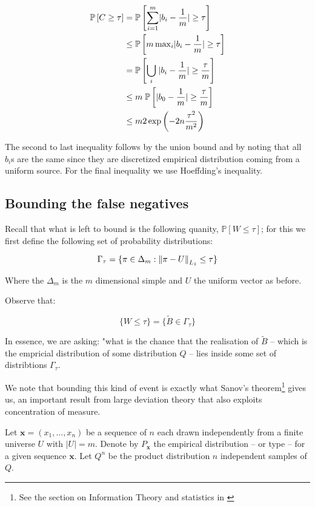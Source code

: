 \begin{align}
    \mathbb{P}\left[ C \geq \tau \right] &= \mathbb{P}\left[ \sum_{i = 1}^{m} \lvert b_i - \frac{1}{m}\rvert \geq \tau \right]  \\
    &\leq \mathbb{P}\left[ m \operatorname{max}_{i} \lvert b_i - \frac{1}{m}\rvert \geq \tau \right]  \\
    &= \mathbb{P}\left[ \bigcup_{i} \; \lvert b_i - \frac{1}{m}\rvert \geq \frac{\tau}{m} \right]  \\
    &\leq m \; \mathbb{P}\left[ \lvert b_0 - \frac{1}{m}\rvert \geq \frac{\tau}{m} \right] \\
    &\leq m2\exp \left( -2n \frac{\tau^2}{m^2} \right)
\end{align}

The second to last inequality follows by the union bound and by noting that all $b_i$s are the same since they
are discretized empirical distribution coming from a uniform source. For the final inequality we use Hoeffding's
inequality.

\subsection{Bounding the false negatives}

Recall that what is left to bound is the following quanity, $\mathbb{P}\left[W \leq \tau \right]$; 
for this we first define the following set of probability distributions:

$$
    \Gamma_\tau = \{ \pi \in  \Delta_m : \left\lVert\pi - U\right\rVert_{L_1} \leq \tau \}
$$

Where the $\Delta_m$ is the $m$ dimensional simple and $U$ the uniform vector as before.

Observe that: 

$$
    \{ W \leq \tau \} = \{ \tilde{B} \in \Gamma_\tau \}
$$

In essence, we are asking: "what is the chance that the realisation of $\tilde{B}$ – which is the 
empricial distribution of some distribution $Q$ – lies inside some set of distribtions $\Gamma_\tau$.

We note that bounding this kind of event is exactly what Sanov's theorem\footnote{See the section on Information Theory and statistics in 
\cite{cover1999elements}} gives us, an important
result from large deviation theory that also exploits concentration of measure.



Let $\mathbf{x} = (x_1, ..., x_n)$ be a sequence of $n$ each drawn independently from 
a finite universe $U$ with $|U| = m$. Denote by $P_\mathbf{x}$ the empirical distribution – 
or type – for a given sequence $\mathbf{x}$. Let $Q^{n}$ be the product distribution $n$
independent samples of $Q$. 

